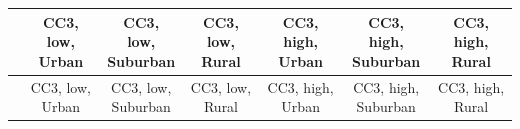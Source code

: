 
\begin{center}
\begin{small}
\begin{longtable}{l@{} c@{} c@{} c@{} c@{} c@{} c@{}}
\hline
 & \shortstack{\rule{0pt}{2.2ex}\hspace{0.25cm}CC3, low,\hspace{0.25cm}\\Urban} & \shortstack{\rule{0pt}{2.2ex}\hspace{0.25cm}CC3, low,\hspace{0.25cm}\\Suburban} & \shortstack{\rule{0pt}{2.2ex}\hspace{0.25cm}CC3, low,\hspace{0.25cm}\\Rural} & \shortstack{\rule{0pt}{2.2ex}\hspace{0.25cm}CC3, high,\hspace{0.25cm}\\Urban} & \shortstack{\rule{0pt}{2.2ex}\hspace{0.25cm}CC3, high,\hspace{0.25cm}\\Suburban} & \shortstack{\rule{0pt}{2.2ex}\hspace{0.25cm}CC3, high,\hspace{0.25cm}\\Rural} \\
\hline
\endfirsthead
\hline
 & \shortstack{\rule{0pt}{2.2ex}\hspace{0.25cm}CC3, low,\hspace{0.25cm}\\Urban} & \shortstack{\rule{0pt}{2.2ex}\hspace{0.25cm}CC3, low,\hspace{0.25cm}\\Suburban} & \shortstack{\rule{0pt}{2.2ex}\hspace{0.25cm}CC3, low,\hspace{0.25cm}\\Rural} & \shortstack{\rule{0pt}{2.2ex}\hspace{0.25cm}CC3, high,\hspace{0.25cm}\\Urban} & \shortstack{\rule{0pt}{2.2ex}\hspace{0.25cm}CC3, high,\hspace{0.25cm}\\Suburban} & \shortstack{\rule{0pt}{2.2ex}\hspace{0.25cm}CC3, high,\hspace{0.25cm}\\Rural} \\

\end{longtable}
\end{small}
\end{center}
